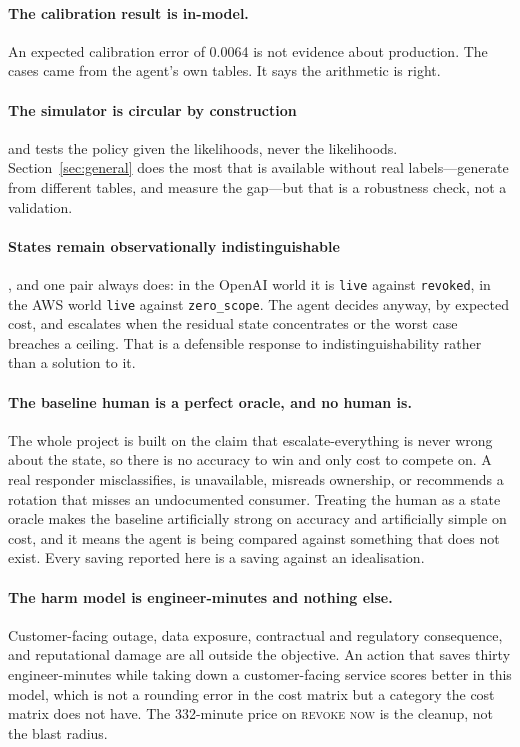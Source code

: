 \documentclass{article}
\begin{document}
\paragraph{The calibration result is in-model.} An expected calibration error of
0.0064 is not evidence about production. The cases came from the agent's own
tables. It says the arithmetic is right.

\paragraph{The simulator is circular by construction} and tests the policy given
the likelihoods, never the likelihoods. Section~\ref{sec:general} does the most
that is available without real labels---generate from different tables, and
measure the gap---but that is a robustness check, not a validation.

\paragraph{States remain observationally indistinguishable}, and one pair always
does: in the OpenAI world it is \texttt{live} against \texttt{revoked}, in the AWS
world \texttt{live} against \texttt{zero\_scope}. The agent decides anyway, by
expected cost, and escalates when the residual state concentrates or the worst
case breaches a ceiling. That is a defensible response to indistinguishability
rather than a solution to it.

\paragraph{The baseline human is a perfect oracle, and no human is.} The whole
project is built on the claim that escalate-everything is never wrong about the
state, so there is no accuracy to win and only cost to compete on. A real
responder misclassifies, is unavailable, misreads ownership, or recommends a
rotation that misses an undocumented consumer. Treating the human as a state
oracle makes the baseline artificially strong on accuracy and artificially simple
on cost, and it means the agent is being compared against something that does not
exist. Every saving reported here is a saving against an idealisation.

\paragraph{The harm model is engineer-minutes and nothing else.} Customer-facing
outage, data exposure, contractual and regulatory consequence, and reputational
damage are all outside the objective. An action that saves thirty engineer-minutes
while taking down a customer-facing service scores better in this model, which is
not a rounding error in the cost matrix but a category the cost matrix does not
have. The 332-minute price on \textsc{revoke now} is the cleanup, not the
blast radius.
\end{document}
